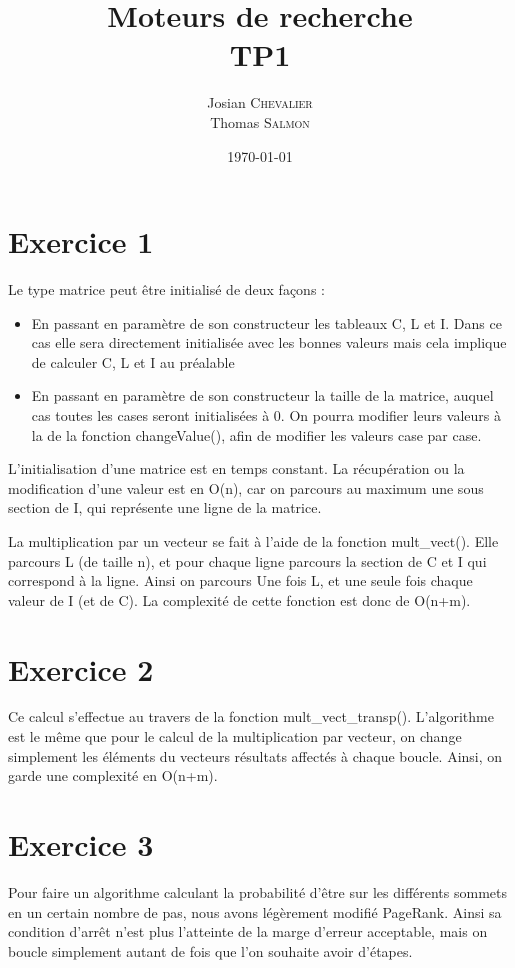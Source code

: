 \documentclass{article}
\title{Moteurs de recherche \\ TP1} %
\author{Josian \textsc{Chevalier}\\Thomas \textsc{Salmon}} %
\date{\today} %
\begin{document}
\maketitle %

\section{Exercice 1}

	Le type matrice peut être initialisé de deux façons :
	\begin{itemize}
		\item En passant en paramètre de son constructeur les tableaux C, L et I. Dans ce cas elle sera directement initialisée avec les bonnes valeurs mais cela implique de calculer C, L et I au préalable
		\item En passant en paramètre de son constructeur la taille de la matrice, auquel cas toutes les cases seront initialisées à 0. On pourra modifier leurs valeurs à la de la fonction changeValue(), afin de modifier les valeurs case par case.
	\end{itemize}

	L'initialisation d'une matrice est en temps constant. La récupération ou la modification d'une valeur est en O(n), car on parcours au maximum une sous section de I, qui représente une ligne de la matrice.

	La multiplication par un vecteur se fait à l'aide de la fonction mult\_vect(). Elle parcours L (de taille n), et pour chaque ligne parcours la section de C et I qui correspond à la ligne. Ainsi on parcours Une fois L, et une seule fois chaque valeur de I (et de C). La complexité de cette fonction est donc de O(n+m).

\section{Exercice 2}

	Ce calcul s'effectue au travers de la fonction mult\_vect\_transp(). L'algorithme est le même que pour le calcul de la multiplication par vecteur, on change simplement les éléments du vecteurs résultats affectés à chaque boucle. Ainsi, on garde une complexité en O(n+m).

\section{Exercice 3}

	Pour faire un algorithme calculant la probabilité d'être sur les différents sommets en un certain nombre de pas, nous avons légèrement modifié PageRank. Ainsi sa condition d'arrêt n'est plus l'atteinte de la marge d'erreur acceptable, mais on boucle simplement autant de fois que l'on souhaite avoir d'étapes.
	
\end{document}
